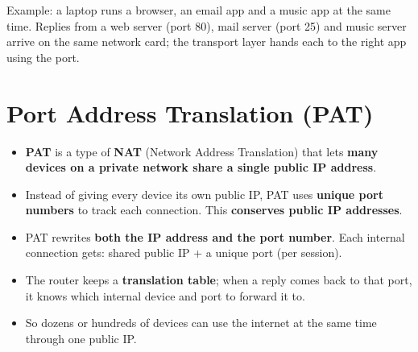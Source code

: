 \begin{center}
\end{center}

Example: a laptop runs a browser, an email app and a music app at the same time. Replies from a web server (port 80), mail server (port 25) and music server arrive on the same network card; the transport layer hands each to the right app using the port.

\section{Port Address Translation (PAT)}
\begin{itemize}
  \item \textbf{PAT} is a type of \textbf{NAT} (Network Address Translation) that lets \textbf{many devices on a private network share a single public IP address}.
  \item Instead of giving every device its own public IP, PAT uses \textbf{unique port numbers} to track each connection. This \textbf{conserves public IP addresses}.
  \item PAT rewrites \textbf{both the IP address and the port number}. Each internal connection gets: shared public IP + a unique port (per session).
  \item The router keeps a \textbf{translation table}; when a reply comes back to that port, it knows which internal device and port to forward it to.
  \item So dozens or hundreds of devices can use the internet at the same time through one public IP.
\end{itemize}


